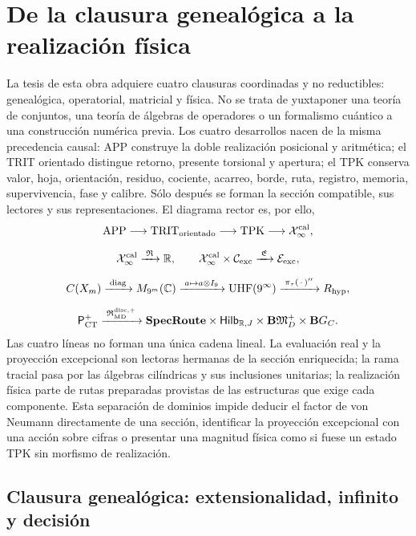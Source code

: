 \section*{De la clausura genealógica a la realización física}

La tesis de esta obra adquiere cuatro clausuras coordinadas y no reductibles:
genealógica, operatorial, matricial y física. No se trata de yuxtaponer una
teoría de conjuntos, una teoría de álgebras de operadores o un formalismo
cuántico a una construcción numérica previa. Los cuatro desarrollos nacen de
la misma precedencia causal: APP construye la doble realización posicional y
aritmética; el TRIT orientado distingue retorno, presente torsional y apertura;
el TPK conserva valor, hoja, orientación, residuo, cociente, acarreo, borde,
ruta, registro, memoria, supervivencia, fase y calibre. Sólo después se forman
la sección compatible, sus lectores y sus representaciones. El diagrama rector
es, por ello,
\[
\begin{gathered}
 \mathrm{APP}
 \longrightarrow \mathrm{TRIT}_{\rm orientado}
 \longrightarrow \mathrm{TPK}
 \longrightarrow \mathcal X_\infty^{\rm cal},\\[2mm]
 \mathcal X_\infty^{\rm cal}
 \xrightarrow{\;\mathfrak R\;}\mathbb R,
 \qquad
 \mathcal X_\infty^{\rm cal}\times\mathcal C_{\rm exc}
 \xrightarrow{\;\mathfrak E\;}\mathcal E_{\rm exc},\\[2mm]
 C(X_m)\xrightarrow{\;\operatorname{diag}\;}M_{9^m}(\mathbb C)
 \xrightarrow{\;a\mapsto a\otimes I_9\;}
 \mathrm{UHF}(9^\infty)
 \xrightarrow{\;\pi_\tau(\,\cdot\,)''\;}R_{\rm hyp},\\[2mm]
 \mathsf P_{\rm CT}^{+}
 \xrightarrow{\;\mathfrak R_{\rm MD}^{\rm disc,+}\;}
 \mathbf{SpecRoute}\times\mathsf{Hilb}_{\mathbb R,J}
 \times\mathbf B\mathfrak M_D^+\times\mathbf B G_C.
\end{gathered}
\]
Las cuatro líneas no forman una única cadena lineal. La evaluación real y la
proyección excepcional son lectoras hermanas de la sección enriquecida; la
rama tracial pasa por las álgebras cilíndricas y sus inclusiones unitarias; la
realización física parte de rutas preparadas provistas de las estructuras que
exige cada componente. Esta separación de dominios impide deducir el factor de
von Neumann directamente de una sección, identificar la proyección
excepcional con una acción sobre cifras o presentar una magnitud física como
si fuese un estado TPK sin morfismo de realización.

\subsection*{Clausura genealógica: extensionalidad, infinito y decisión}

